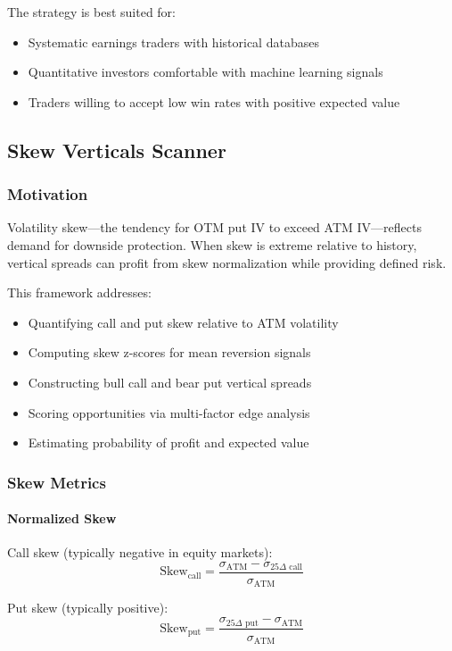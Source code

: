 The strategy is best suited for:
\begin{itemize}
  \item Systematic earnings traders with historical databases
  \item Quantitative investors comfortable with machine learning signals
  \item Traders willing to accept low win rates with positive expected value
\end{itemize}

\subsection{Skew Verticals Scanner}

\subsubsection{Motivation}

Volatility skew---the tendency for OTM put IV to exceed ATM IV---reflects demand for downside protection. When skew is extreme relative to history, vertical spreads can profit from skew normalization while providing defined risk.

This framework addresses:
\begin{itemize}
  \item Quantifying call and put skew relative to ATM volatility
  \item Computing skew z-scores for mean reversion signals
  \item Constructing bull call and bear put vertical spreads
  \item Scoring opportunities via multi-factor edge analysis
  \item Estimating probability of profit and expected value
\end{itemize}

\subsubsection{Skew Metrics}

\paragraph{Normalized Skew}

Call skew (typically negative in equity markets):
\[
\text{Skew}_{\text{call}} = \frac{\sigma_{\text{ATM}} - \sigma_{25\Delta\text{ call}}}{\sigma_{\text{ATM}}}
\]

Put skew (typically positive):
\[
\text{Skew}_{\text{put}} = \frac{\sigma_{25\Delta\text{ put}} - \sigma_{\text{ATM}}}{\sigma_{\text{ATM}}}
\]

